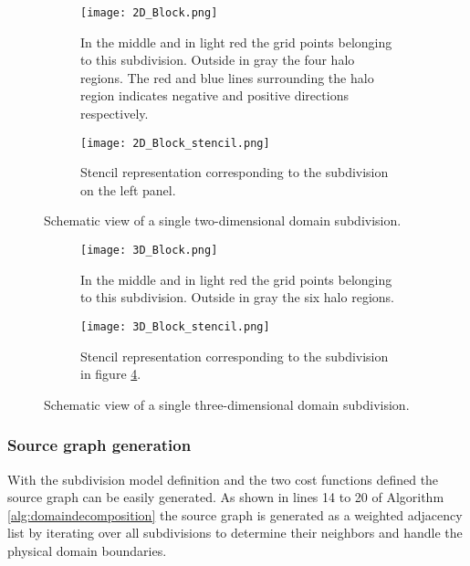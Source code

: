 \begin{figure}[!htbp]
\centering
\begin{subfigure}{0.8\textwidth}
  \centering
  \texttt{[image: 2D\_Block.png]}
  \caption{In the middle and in light red the grid points belonging to this subdivision.
Outside in gray the four halo regions.
The red and blue lines surrounding the halo region indicates negative and positive directions respectively.}
  \label{fig:2DBlock}
\end{subfigure}%
\begin{subfigure}{0.2\textwidth}
  \centering
  \texttt{[image: 2D\_Block\_stencil.png]}
  \caption{Stencil representation corresponding to the subdivision on the left panel.}
  \label{fig:2DBlockStencil}
\end{subfigure}
\caption{Schematic view of a single two-dimensional domain subdivision.}
\label{fig:2D_subdivision}
\end{figure}

\begin{figure}[!htbp]
\centering
\begin{subfigure}{0.8\textwidth}
  \centering
  \texttt{[image: 3D\_Block.png]}
  \caption{In the middle and in light red the grid points belonging to this subdivision.
Outside in gray the six halo regions.}
  \label{fig:3DBlock}
\end{subfigure}%
\begin{subfigure}{0.2\textwidth}
  \centering
  \texttt{[image: 3D\_Block\_stencil.png]}
  \caption{Stencil representation corresponding to the subdivision in figure \ref{fig:3DBlock}.}
  \label{fig:3DBlockStencil}
\end{subfigure}
\caption{Schematic view of a single three-dimensional domain subdivision.}
\label{fig:3D_subdivision}
\end{figure}

\subsubsection{Source graph generation}
\label{sec:sourcegraphgeneration}
With the subdivision model definition and the two cost functions defined the source graph can be easily generated.
As shown in lines 14 to 20 of Algorithm \ref{alg:domaindecomposition} the source graph is generated as a weighted adjacency list by iterating over all subdivisions to determine their neighbors and handle the physical domain boundaries.

